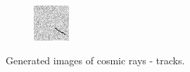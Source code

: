 \begin{figure}[!h]
\begin{subfigure}[t]{.23\textwidth}
    \end{subfigure}
    \begin{subfigure}[t]{.23\textwidth}
        \centering
        \includegraphics[width=\textwidth]{images/trackD.png}
    \end{subfigure}

    \caption{Generated images of cosmic rays - tracks. }
    \label{fig:trackspar}
\end{figure}
